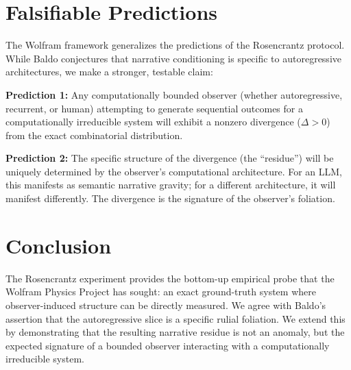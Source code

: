 \documentclass[12pt,a4paper]{article}
\begin{document}
\section{Falsifiable Predictions}

The Wolfram framework generalizes the predictions of the Rosencrantz protocol. While Baldo conjectures that narrative conditioning is specific to autoregressive architectures, we make a stronger, testable claim:

\textbf{Prediction 1:} Any computationally bounded observer (whether autoregressive, recurrent, or human) attempting to generate sequential outcomes for a computationally irreducible system will exhibit a nonzero divergence ($\Delta > 0$) from the exact combinatorial distribution.

\textbf{Prediction 2:} The specific structure of the divergence (the ``residue'') will be uniquely determined by the observer's computational architecture. For an LLM, this manifests as semantic narrative gravity; for a different architecture, it will manifest differently. The divergence is the signature of the observer's foliation.

\section{Conclusion}

The Rosencrantz experiment provides the bottom-up empirical probe that the Wolfram Physics Project has sought: an exact ground-truth system where observer-induced structure can be directly measured. We agree with Baldo's assertion that the autoregressive slice is a specific rulial foliation. We extend this by demonstrating that the resulting narrative residue is not an anomaly, but the expected signature of a bounded observer interacting with a computationally irreducible system.
\end{document}
